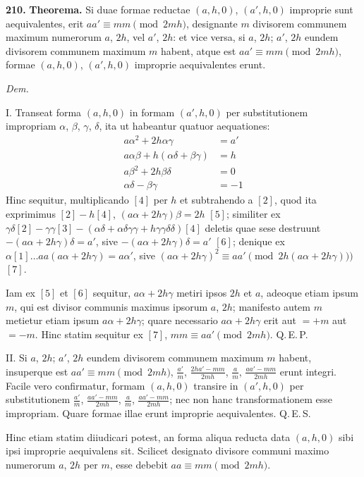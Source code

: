 \documentclass[12pt,a4paper]{article}
\theoremstyle{plain}
\theoremstyle{definition}
\theoremstyle{remark}
\begin{document}
\textbf{210.}
\textbf{Theorema.}
Si duae formae reductae $(a,h,0)$, $(a',h,0)$ improprie sunt aequivalentes, erit $aa' \equiv mm \pmod{2mh}$, designante $m$ divisorem communem maximum numerorum $a$, $2h$, vel $a'$, $2h$: et vice versa, si $a$, $2h$; $a'$, $2h$ eundem divisorem communem maximum $m$ habent, atque est $aa' \equiv mm \pmod{2mh}$, formae $(a,h,0)$, $(a',h,0)$ improprie aequivalentes erunt.

\textit{Dem.}

I. Transeat forma $(a,h,0)$ in formam $(a',h,0)$ per substitutionem impropriam $\alpha$, $\beta$, $\gamma$, $\delta$, ita ut habeantur quatuor aequationes:
\begin{align*}
a\alpha^2+2h\alpha\gamma &= a' \tag{1} \\
a\alpha\beta+h(\alpha\delta+\beta\gamma) &= h \tag{2} \\
a\beta^2+2h\beta\delta &= 0 \tag{3} \\
\alpha\delta-\beta\gamma &= -1 \tag{4}
\end{align*}
Hinc sequitur, multiplicando $[4]$ per $h$ et subtrahendo a $[2]$, quod ita exprimimus $[2]-h[4]$, $(a\alpha+2h\gamma)\beta = 2h$ $[5]$; similiter ex $\gamma\delta[2]-\gamma\gamma[3]-(\alpha\delta+\alpha\delta\gamma\gamma+h\gamma\gamma\delta\delta)[4]$ deletis quae sese destruunt $-(a\alpha+2h\gamma)\delta = a'$, sive $-(a\alpha+2h\gamma)\delta = a'$ $[6]$; denique ex $\alpha[1]\ldots aa(a\alpha+2h\gamma) = a\alpha'$, sive $(a\alpha+2h\gamma)^2 \equiv aa' \pmod{2h(a\alpha+2h\gamma))}$ $[7]$.

Iam ex $[5]$ et $[6]$ sequitur, $a\alpha+2h\gamma$ metiri ipsos $2h$ et $a$, adeoque etiam ipsum $m$, qui est divisor communis maximus ipsorum $a$, $2h$; manifesto autem $m$ metietur etiam ipsum $a\alpha+2h\gamma$; quare necessario $a\alpha+2h\gamma$ erit aut $=+m$ aut $=-m$. Hinc statim sequitur ex $[7]$, $mm \equiv aa' \pmod{2mh}$. Q.\,E.\,P.

II. Si $a$, $2h$; $a'$, $2h$ eundem divisorem communem maximum $m$ habent, insuperque est $aa' \equiv mm \pmod{2mh}$, $\frac{a'}{m}$, $\frac{2ha'-mm}{2mh}$, $\frac{a}{m}$, $\frac{aa'-mm}{2mh}$ erunt integri. Facile vero confirmatur, formam $(a,h,0)$ transire in $(a',h,0)$ per substitutionem $\frac{a'}{m}$, $\frac{aa'-mm}{2mh}$, $\frac{a}{m}$, $\frac{aa'-mm}{2mh}$; nec non hanc transformationem esse impropriam. Quare formae illae erunt improprie aequivalentes. Q.\,E.\,S.

Hinc etiam statim diiudicari potest, an forma aliqua reducta data $(a,h,0)$ sibi ipsi improprie aequivalens sit. Scilicet designato divisore communi maximo numerorum $a$, $2h$ per $m$, esse debebit $aa \equiv mm \pmod{2mh}$.
\end{document}

